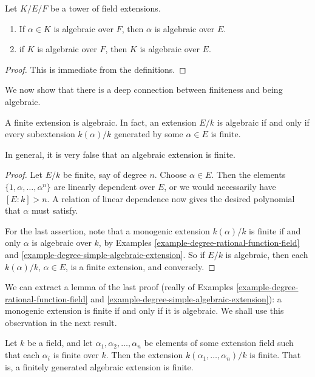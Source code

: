 \begin{lemma}
\label{lemma-algebraic-goes-up}
Let $K/E/F$ be a tower of field extensions.
\begin{enumerate}
\item If $\alpha \in K$ is algebraic over $F$, then $\alpha$ is algebraic
over $E$.
\item if $K$ is algebraic over $F$, then $K$ is algebraic over $E$.
\end{enumerate}
\end{lemma}

\begin{proof}
This is immediate from the definitions.
\end{proof}

\noindent
We now show that there is a deep connection between finiteness and being
algebraic.

\begin{lemma}
\label{lemma-finite-is-algebraic}
A finite extension is algebraic. In fact, an extension $E/k$ is algebraic
if and only if every subextension $k(\alpha)/k$ generated by some
$\alpha \in E$ is finite.
\end{lemma}

\noindent
In general, it is very false that an algebraic extension is finite.

\begin{proof}
Let $E/k$ be finite, say of degree $n$. Choose $\alpha \in E$. Then the
elements $\{1, \alpha, \dots, \alpha^n\}$ are linearly
dependent over $E$, or we would necessarily have $[E : k] > n$. A relation of
linear dependence now gives the desired polynomial that $\alpha$ must satisfy.

\medskip\noindent
For the last assertion, note that a monogenic extension $k(\alpha)/k$ is
finite if and only $\alpha$ is algebraic over $k$, by
Examples \ref{example-degree-rational-function-field} and
\ref{example-degree-simple-algebraic-extension}.
So if $E/k$ is algebraic, then each $k(\alpha)/k$, $\alpha \in E$, is a finite
extension, and conversely.
\end{proof}

\noindent
We can extract a lemma of the last proof (really of
Examples \ref{example-degree-rational-function-field} and
\ref{example-degree-simple-algebraic-extension}):
a monogenic extension is finite if and only if it is algebraic.
We shall use this observation in the next result.

\begin{lemma}
\label{lemma-algebraic-finitely-generated}
Let $k$ be a field, and let $\alpha_1, \alpha_2, \dots, \alpha_n$ be elements
of some extension field such that each $\alpha_i$ is finite over $k$. Then the
extension $k(\alpha_1, \dots, \alpha_n)/k$ is finite.
That is, a finitely generated algebraic extension is finite.
\end{lemma}

